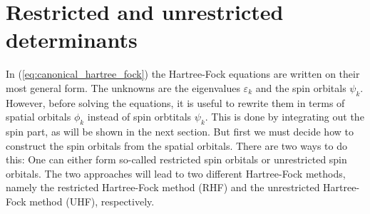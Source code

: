 \section{Restricted and unrestricted determinants}
\label{sec:res_and_unres_dets}
In (\ref{eq:canonical_hartree_fock}) the Hartree-Fock equations are written on their most general form. The unknowns are the eigenvalues $\varepsilon_k$ and the spin orbitals $\psi_k$.
However, before solving the equations, it is useful to rewrite them in terms of spatial orbitals $\phi_k$ instead of spin orbtitals $\psi_k$. This is done by
integrating out the spin part, as will be shown in the next section. But first we must decide how to construct the spin orbitals from the spatial orbitals. There are two
ways to do this: One can either form so-called restricted spin orbitals or unrestricted spin orbitals. The two approaches will lead to two different Hartree-Fock methods,
namely the restricted Hartree-Fock method (RHF) and the unrestricted Hartree-Fock method (UHF), respectively.

